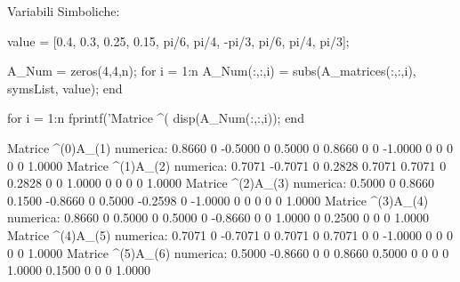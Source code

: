 \documentclass[11pt, a4paper]{article}
\begin{document}
\begin{matlaboutput}
Variabili Simboliche:
\end{matlaboutput}
\newpage
\begin{matlabcode}
value = [0.4, 0.3, 0.25, 0.15, pi/6, pi/4, -pi/3, pi/6, pi/4, pi/3];

A_Num = zeros(4,4,n);
for i = 1:n
    A_Num(:,:,i) = subs(A_matrices(:,:,i), symsList, value);
end

for i = 1:n
    fprintf('Matrice ^(%
    disp(A_Num(:,:,i));
end
\end{matlabcode}
\begin{matlaboutput}
Matrice ^(0)A_(1) numerica:
    0.8660         0   -0.5000         0
    0.5000         0    0.8660         0
         0   -1.0000         0         0
         0         0         0    1.0000
Matrice ^(1)A_(2) numerica:
    0.7071   -0.7071         0    0.2828
    0.7071    0.7071         0    0.2828
         0         0    1.0000         0
         0         0         0    1.0000
Matrice ^(2)A_(3) numerica:
    0.5000         0    0.8660    0.1500
   -0.8660         0    0.5000   -0.2598
         0   -1.0000         0         0
         0         0         0    1.0000
Matrice ^(3)A_(4) numerica:
    0.8660         0    0.5000         0
    0.5000         0   -0.8660         0
         0    1.0000         0    0.2500
         0         0         0    1.0000
Matrice ^(4)A_(5) numerica:
    0.7071         0   -0.7071         0
    0.7071         0    0.7071         0
         0   -1.0000         0         0
         0         0         0    1.0000
Matrice ^(5)A_(6) numerica:
    0.5000   -0.8660         0         0
    0.8660    0.5000         0         0
         0         0    1.0000    0.1500
         0         0         0    1.0000
\end{matlaboutput}

\end{document}
